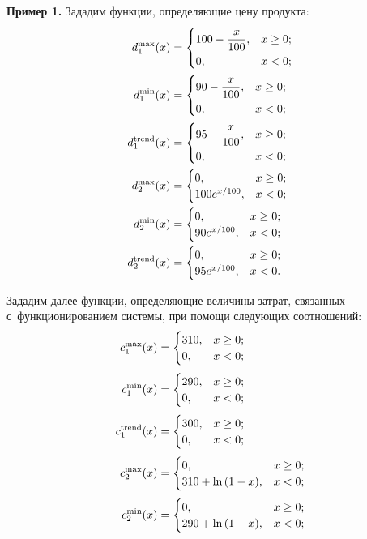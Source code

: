 \begin{multicols}{2}
\noindent
\textbf{Пример 1.} 
Зададим функции, определяющие цену продукта:
\begin{align*}
d_1^{\max}(x)&=\begin{cases}
   100 -\fr{x}{100},  &x\geq0;\\
   0,  &x<0;
   \end{cases}
\\
d_1^{\min}(x)&= \begin{cases}
  90 -\fr{x}{100}, & x\geq0;\\
 0, &x<0;
 \end{cases}
\\
d_1^{\mathrm{trend}}(x)&=\begin{cases}
   95 -\fr{x}{100}, & x\geq0;\\
   0,  &x<0;
   \end{cases}
   \\
d_2^{\max}(x)&=    \begin{cases}
0, &x \geq0;\\
100e^{{x}/{100}}, &x<0;
\end{cases}
\\
d_2^{\min}(x)&=   \begin{cases}
0, & x\hm\geq0;\\
 90e^{{x}/{100}}, &x<0;
 \end{cases}
\\
d_2^{\mathrm{trend}}(x)&= 
\begin{cases}
0, &x\hm\geq0;\\
95e^{{x}/{100}},  &x<0.
\end{cases}
\end{align*}

Зададим далее функции, определяющие величины за\-трат, связанных 
с~функционированием сис\-те\-мы, при помощи сле\-ду\-ющих соотношений:
\begin{align*}
c_1^{\max}(x)&=\begin{cases}
   310,  &x\geq0;\\
   0, & x<0;
   \end{cases}
  \\[3pt]
c_1^{\min}(x)&=\begin{cases}
   290, & x\hm\geq0;\\
   0,  & x<0;
   \end{cases}
   \\[3pt]
c_1^{\mathrm{trend}}(x)&=
\begin{cases}
 300, &x\geq0;\\
  0, & x<0;
  \end{cases}
  \\[3pt]
c_2^{\max}(x)&= \begin{cases}
  0, & x\geq0;\\
  310 \hm+ \ln{(1-x)}, & x<0;
  \end{cases}
 \\[3pt]
c_2^{\min}(x)&=\begin{cases}
    0, & x\hm\geq0; \\
    290 + \ln{(1-x)}, & x\hm<0;
    \end{cases}
    \end{align*}
    

\end{multicols}
